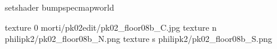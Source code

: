 setshader bumpspecmapworld

texture 0 morti/pk02edit/pk02_floor08b_C.jpg
texture n philipk2/pk02_floor08b_N.png
texture s philipk2/pk02_floor08b_S.png


